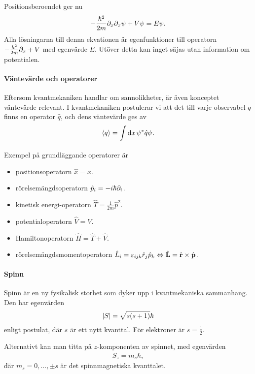 Positionsberoendet ger nu
\begin{align*}
	-\frac{\hbar^{2}}{2m}\partial_{x}\partial_{x}\psi + V\psi = E\psi.
\end{align*}
Alla lösningarna till denna ekvationen är egenfunktioner till operatorn $-\frac{\hbar^{2}}{2m}\partial_{x} + V$ med egenvärde $E$. Utöver detta kan inget säjas utan information om potentialen.

\paragraph{Väntevärde och operatorer}
Eftersom kvantmekaniken handlar om sannolikheter, är även konceptet väntevärde relevant. I kvantmekaniken postulerar vi att det till varje observabel $q$ finns en operator $\hat{q}$, och dens väntevärde ges av
\begin{align*}
	\expval{q} = \int\limits_{}\dd{x}\psi^{*}\hat{q}\psi.
\end{align*}
Exempel på grundläggande operatorer är
\begin{itemize}
	\item positionsoperatorn $\hat{x} = x$.
	\item rörelsemängdsoperatorn $\hat{p}_{i} = -i\hbar\partial_{i}$.
	\item kinetisk energi-operatorn $\hat{T} = \frac{1}{2m}\hat{p}^{2}$.
	\item potentialoperatorn $\hat{V} = V$.
	\item Hamiltonoperatorn $\hat{H} = \hat{T} + \hat{V}$.
	\item rörelsemängdsmomentoperatorn $\hat{L}_{i} = \varepsilon_{ijk}\hat{r}_{j}\hat{p}_{k}\Leftrightarrow \hat{\vb{L}} = \hat{\vb{r}}\times\hat{\vb{p}}$.
\end{itemize}

\paragraph{Spinn}
Spinn är en ny fysikalisk storhet som dyker upp i kvantmekaniska sammanhang. Den har egenvärden
\begin{align*}
	\abs{S} = \sqrt{s(s + 1)}\hbar
\end{align*}
enligt postulat, där $s$ är ett nytt kvanttal. För elektroner är $s = \frac{1}{2}$.

Alternativt kan man titta på $z$-komponenten av spinnet, med egenvärden
\begin{align*}
	S_{z} = m_{s}\hbar,
\end{align*}
där $m_{s} = 0, \dots, \pm s$ är det spinnmagnetiska kvanttalet.

